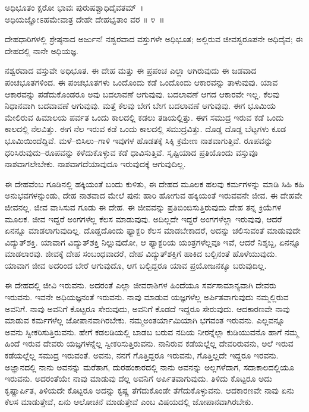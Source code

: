 \begin{shloka}
ಅಧಿಭೂತಂ ಕ್ಷರೋ ಭಾವಃ ಪುರುಷಶ್ಚಾಧಿದೈವತಮ್~।\\ಅಧಿಯಜ್ಞೋಽಹಮೇವಾತ್ರ ದೇಹೇ ದೇಹಭೃತಾಂ ವರ \hfill॥ ೪~॥
\end{shloka}

\begin{artha}
ದೇಹಧಾರಿಗಳಲ್ಲಿ ಶ್ರೇಷ್ಠನಾದ ಅರ್ಜುನ! ನಶ್ವರವಾದ ವಸ್ತುಗಳೇ ಅಧಿಭೂತ; ಅಲ್ಲಿರುವ ಜೀವಸ್ವರೂಪನೇ ಅಧಿದೈವ; ಈ ದೇಹದಲ್ಲಿ ನಾನೇ ಅಧಿಯಜ್ಞ.
\end{artha}

ನಶ್ವರವಾದ ವಸ್ತುವೇ ಅಧಿಭೂತ. ಈ ದೇಹ ಮತ್ತು ಈ ಪ್ರಪಂಚ ಎಲ್ಲಾ ಆಗಿರುವುದು ಈ ಜಡವಾದ ಪಂಚಭೂತಗಳಿಂದ. ಈ ಪಂಚಭೂತಗಳು ಒಂದೊಂದು ಕಡೆ ಒಂದೊಂದು ಆಕಾರವನ್ನು ತಾಳುವುವು. ಯಾವ ಆಕಾರವನ್ನು ಪಡೆದುಕೊಂಡರೂ ಅವು ಬದಲಾವಣೆ ಆಗುವುವು. ಬದಲಾವಣೆ ಆಗದ ಆಕಾರವೇ ಇಲ್ಲ. ಕೆಲವು ನಿಧಾನವಾಗಿ ಬದವಾವಣೆ ಆಗುವುವು. ಮತ್ತೆ ಕೆಲವು ಬೇಗ ಬೇಗ ಬದಲಾವಣೆ ಆಗುವುವು. ಈಗ ಭೂಮಿಯ ಮೇಲಿರುವ ಹಿಮಾಲಯ ಪರ್ವತ ಒಂದು ಕಾಲದಲ್ಲಿ ಕಡಲು ತಡಿಯಲ್ಲಿತ್ತು. ಈಗ ಸಮುದ್ರ ಇರುವ ಕಡೆ ಒಂದು ಕಾಲದಲ್ಲಿ ನೆಲವಿತ್ತು. ಈಗ ನೆಲ ಇರುವ ಕಡೆ ಒಂದು ಕಾಲದಲ್ಲಿ ಸಮುದ್ರವಿತ್ತು. ದೊಡ್ಡ ದೊಡ್ಡ ಬೆಟ್ಟಗಳು ಕೂಡ ಭೂಮಿಯಿಂದೆದ್ದಿವೆ. ಮಳೆ–ಬಿಸಿಲು–ಗಾಳಿ ಇವುಗಳ ಹೊಡತಕ್ಕೆ ಸಿಕ್ಕಿ ಕ್ರಮೇಣ ನಾಶವಾಗುತ್ತಿವೆ. ರೂಪವನ್ನು ಧರಿಸಿರುವುದು–ರೂಪವನ್ನು ಕಳೆದುಕೊಳ್ಳುವ ಕಡೆ ಧಾವಿಸುತ್ತಿವೆ. ಸೃಷ್ಟಿಯಾದ ಪ್ರತಿಯೊಂದು ವಸ್ತುವೂ ನಾಶವಾಗಲೇಬೇಕು. ನಾಶವಾಗದೆ\break ಯಾವುದೂ ಇರುವುದಕ್ಕೆ ಆಗುವುದಿಲ್ಲ. 

ಈ ದೇಹವೆಂಬ ಗೂಡಿನಲ್ಲಿ ಹಕ್ಕಿಯಂತೆ ಬಂದು ಕುಳಿತು, ಈ ದೇಹದ ಮೂಲಕ ಹಲವು ಕರ್ಮಗಳನ್ನು ಮಾಡಿ ಸಿಹಿ ಕಹಿ ಅನುಭವಗಳನ್ನುಂಡು, ದೇಹ ನಾಶವಾದ ಮೇಲೆ ಪುನಃ ಹಾರಿ ಹೋಗುವ ಹಕ್ಕಿಯಂತೆ ಇರುವವನೇ ಜೀವ. ಈ ದೇಹವೇ ಜೀವನಲ್ಲ. ಜೀವ ವಾಸಿಸುವ ಗೂಡು ಈ ದೇಹ. ಈ ಜೀವವನ್ನು ಪ್ರತಿಬಿಂಬಿಸುತ್ತಿರುವುದು ದೇಹ ತನ್ನ ಕ್ರಿಯೆಗಳ ಮೂಲಕ. ಜೀವ ಇದ್ದರೆ ಅಂಗಗಳೆಲ್ಲ ಕೆಲಸ ಮಾಡುವುವು. ಅದಿಲ್ಲದೇ ಇದ್ದರೆ ಅಂಗಗಳೆಲ್ಲಾ ಇರುವುವು, ಆದರೆ ಏನನ್ನೂ ಮಾಡಲಾಗುವುದಿಲ್ಲ. ದೊಡ್ಡದೊಂದು ಫ್ಯಾಕ್ಟರಿ ಕೆಲಸ ಮಾಡಬೇಕಾದರೆ, ಅದನ್ನು ಚಲಿಸುವಂತೆ ಮಾಡುವುದೇ ವಿದ್ಯುತ್​ಶಕ್ತಿ. ಯಾವಾಗ ವಿದ್ಯುತ್​ಶಕ್ತಿ ನಿಲ್ಲುವುದೋ, ಆ ಫ್ಯಾಕ್ಟರಿಯ ಯಂತ್ರಗಳೆಲ್ಲವೂ ಇವೆ, ಆದರೆ ನಿಶ್ಶಬ್ದ, ಏನನ್ನೂ ಮಾಡಲಾರವು. ಜೀವಕ್ಕೆ ದೇಹ ಸಂಬಂಧವಾದರೆ, ದೇಹ ವಿದ್ಯುತ್​ಶಕ್ತಿಗೆ ಹಾಕಿದ ಬಲ್ಬಿನಂತೆ ಹೊಳೆಯುವುದು. ಯಾವಾಗ ಜೀವ ಅದರಿಂದ ಬೇರೆ ಆಗುವುದೊ, ಆಗ ಬಲ್ಬಿದ್ದರೂ ಯಾವ ಪ್ರಯೋಜನಕ್ಕೂ ಬರುವುದಿಲ್ಲ.

ಈ ದೇಹದಲ್ಲಿ ಜೀವಿ ಇರುವನು. ಅದರಂತೆ ಎಲ್ಲಾ ಜೀವರಾಶಿಗಳ ಹಿಂದೆಯೂ ಸರ್ವ\-ಸಾಮಾನ್ಯವಾಗಿ ದೇವರು ಇರುವನು. ಇವನೇ ಅಧಿಯಜ್ಞನಂತೆ ಇರುವನು. ನಾವು ಮಾಡುವ ಯಜ್ಞಗಳೆಲ್ಲ ಅರ್ಪಿತವಾಗುವುದು ನಮ್ಮಲ್ಲಿರುವ ಅವನಿಗೆ. ನಾವು ಅವನಿಗೆ ಕೊಟ್ಟರೂ ಸೇರುವುದು, ಅವನಿಗೆ ಕೊಡದೆ ಇದ್ದರೂ ಸೇರುವುದು. ಆದಕಾರಣವೇ ನಾವು ಮಾಡುವ ಕರ್ಮಗಳೆಲ್ಲ ಜೋಪಾನವಾಗಿರಬೇಕು. ನಮ್ಮಅಂತರ್ಯಾಮಿಯಾಗಿ ಭಗವಂತ ಇರುವನು. ಎಲ್ಲವನ್ನೂ ಅವನು ಸ್ವೀಕರಿಸುತ್ತಿರುವನು. ಹೇಗೆ ಕಡಲಡಿಯಲ್ಲಿ ಬಾಡಬ ಬರುವ ನದಿಯ ನೀರನ್ನೆಲ್ಲಾ ಕುಡಿಯುವನೊ ಹಾಗೆ ನಮ್ಮ ಹಿಂದೆ ಇರುವ ದೇವರು ಯಜ್ಞಗಳನ್ನೆಲ್ಲ ಸ್ವೀಕರಿಸುತ್ತಿರುವನು. ನಾನಿರುವ ಕಡೆಯಲ್ಲೆಲ್ಲ ದೇವರಿರುವನು, ಅಲೆ ಇರುವ ಕಡೆಯಲ್ಲೆಲ್ಲ ಸಮುದ್ರ ಇರುವಂತೆ. ಅವನು, ನನಗೆ ಗೊತ್ತಿದ್ದರೂ ಇರುವನು, ಗೊತ್ತಿಲ್ಲದೇ ಇದ್ದರೂ ಇರವನು. ಅಜ್ಞಾನದಲ್ಲಿ ನಾನು ಅವನನ್ನು ಮರೆತಾಗ, ದುರಹಂಕಾರದಲ್ಲಿ ನಾನು ಅವನನ್ನು ಅಲ್ಲಗಳೆದಾಗ, ಸದಾಕಾಲದಲ್ಲಿಯೂ ಇರುವನು. ಅದರಂತೆಯೇ ನಾವು ಮಾಡುವು ದೆಲ್ಲ ಅವನಿಗೆ ಅರ್ಪಿತವಾಗುವುದು. ತಿಳಿದು ಕೊಟ್ಟರೂ ಅದು ಕೃಷ್ಣಾರ್ಪಿತ, ತಿಳಿಯದೇ ಕೊಟ್ಟರೂ ಅದನ್ನು ಕೃಷ್ಣ ತೆಗೆದುಕೊಂಡೇ ತೆಗೆದು\-ಕೊಳ್ಳುವನು. ಆದಕಾರಣವೇ ನಾವು ಏನು ಕೆಲಸ ಮಾಡುತ್ತೇವೆ, ಏನು ಆಲೋಚನೆ ಮಾಡುತ್ತೇವೆ ಎಂಬ ವಿಷಯದಲ್ಲಿ ಜೋಪಾನವಾಗಿರಬೇಕು.

